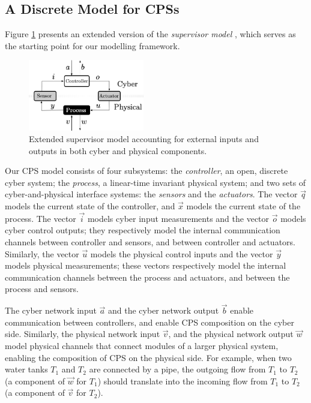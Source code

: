 \subsection{A Discrete Model for CPSs}
Figure \ref{fig:IFCPS} presents an extended version of the \emph{supervisor model} \cite{doi:10.1137/0325013}, which serves as the starting point for our modelling framework. 
\begin{figure}
\centering
\includegraphics[width=0.45\textwidth]{Figures/IFCPS}
\caption{Extended supervisor model accounting for external inputs and outputs in both cyber and physical components.}
\label{fig:IFCPS}
\end{figure}
Our CPS model consists of four subsystems: the \emph{controller}, an open, discrete cyber system; the \emph{process}, a linear-time invariant physical system; and two sets of cyber-and-physical interface systems: the \emph{sensors} and the \emph{actuators}. The vector $\vec{q}$ models the current state of the controller, and $\vec{x}$ models the current state of the process. The vector $\vec{i}$ models cyber input measurements and the vector $\vec{o}$ models cyber control outputs; they respectively model the internal communication channels between controller and sensors, and between controller and actuators. Similarly, the vector $\vec{u}$ models the physical control inputs and the vector $\vec{y}$ models physical measurements; these vectors respectively model the internal communication channels between the process and actuators, and between the process and sensors. 

The cyber network input $\vec{a}$ and the cyber network output $\vec{b}$ enable communication between controllers, and enable CPS composition on the cyber side. Similarly, the physical network input $\vec{v}$, and the physical network output $\vec{w}$ model physical channels that connect modules of a larger physical system, enabling the composition of CPS on the physical side. For example, when two water tanks $T_1$ and $T_2$ are connected by a pipe, the outgoing flow from $T_1$ to $T_2$ (a component of $\vec{w}$ for $T_1$) should translate into the incoming flow from $T_1$ to $T_2$ (a component of $\vec{v}$ for $T_2$). 

